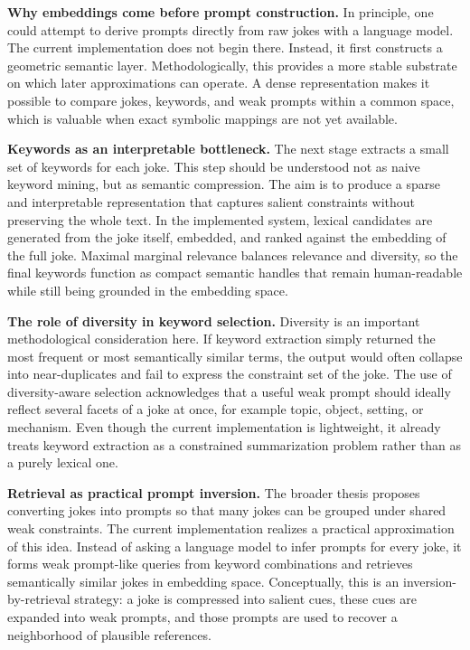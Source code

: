 \documentclass[12pt]{extarticle}
\begin{document}
\textbf{Why embeddings come before prompt construction.} In principle, one could attempt to derive prompts directly from raw jokes with a language model. The current implementation does not begin there. Instead, it first constructs a geometric semantic layer. Methodologically, this provides a more stable substrate on which later approximations can operate. A dense representation makes it possible to compare jokes, keywords, and weak prompts within a common space, which is valuable when exact symbolic mappings are not yet available.

\textbf{Keywords as an interpretable bottleneck.} The next stage extracts a small set of keywords for each joke. This step should be understood not as naive keyword mining, but as semantic compression. The aim is to produce a sparse and interpretable representation that captures salient constraints without preserving the whole text. In the implemented system, lexical candidates are generated from the joke itself, embedded, and ranked against the embedding of the full joke. Maximal marginal relevance balances relevance and diversity, so the final keywords function as compact semantic handles that remain human-readable while still being grounded in the embedding space.

\textbf{The role of diversity in keyword selection.} Diversity is an important methodological consideration here. If keyword extraction simply returned the most frequent or most semantically similar terms, the output would often collapse into near-duplicates and fail to express the constraint set of the joke. The use of diversity-aware selection acknowledges that a useful weak prompt should ideally reflect several facets of a joke at once, for example topic, object, setting, or mechanism. Even though the current implementation is lightweight, it already treats keyword extraction as a constrained summarization problem rather than as a purely lexical one.

\textbf{Retrieval as practical prompt inversion.} The broader thesis proposes converting jokes into prompts so that many jokes can be grouped under shared weak constraints. The current implementation realizes a practical approximation of this idea. Instead of asking a language model to infer prompts for every joke, it forms weak prompt-like queries from keyword combinations and retrieves semantically similar jokes in embedding space. Conceptually, this is an inversion-by-retrieval strategy: a joke is compressed into salient cues, these cues are expanded into weak prompts, and those prompts are used to recover a neighborhood of plausible references.
\end{document}
